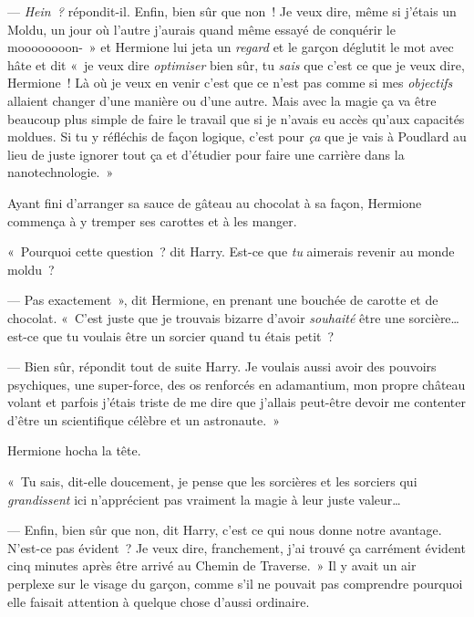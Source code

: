 --- \emph{Hein~?} répondit-il.
Enfin, bien sûr que non~!
Je veux dire, même si j'étais un Moldu, un jour où l'autre j'aurais quand même essayé de conquérir le moooooooon-~» et Hermione lui jeta un \emph{regard} et le garçon déglutit le mot avec hâte et dit «~je veux dire \emph{optimiser} bien sûr, tu \emph{sais} que c'est ce que je veux dire, Hermione~!
Là où je veux en venir c'est que ce n'est pas comme si mes \emph{objectifs} allaient changer d'une manière ou d'une autre.
Mais avec la magie ça va être beaucoup plus simple de faire le travail que si je n'avais eu accès qu'aux capacités moldues.
Si tu y réfléchis de façon logique, c'est pour \emph{ça} que je vais à Poudlard au lieu de juste ignorer tout ça et d'étudier pour faire une carrière dans la nanotechnologie.~»

Ayant fini d'arranger sa sauce de gâteau au chocolat à sa façon, Hermione commença à y tremper ses carottes et à les manger.

«~Pourquoi cette question~? dit Harry.
Est-ce que \emph{tu} aimerais revenir au monde moldu~?

--- Pas exactement~», dit Hermione, en prenant une bouchée de carotte et de chocolat.
«~C'est juste que je trouvais bizarre d'avoir \emph{souhaité} être une sorcière… est-ce que tu voulais être un sorcier quand tu étais petit~?

--- Bien sûr, répondit tout de suite Harry.
Je voulais aussi avoir des pouvoirs psychiques, une super-force, des os renforcés en adamantium, mon propre château volant et parfois j'étais triste de me dire que j'allais peut-être devoir me contenter d'être un scientifique célèbre et un astronaute.~»

Hermione hocha la tête.

«~Tu sais, dit-elle doucement, je pense que les sorcières et les sorciers qui \emph{grandissent} ici n'apprécient pas vraiment la magie à leur juste valeur…

--- Enfin, bien sûr que non, dit Harry, c'est ce qui nous donne notre avantage.
N'est-ce pas évident~?
Je veux dire, franchement, j'ai trouvé ça carrément évident cinq minutes après être arrivé au Chemin de Traverse.~»
Il y avait un air perplexe sur le visage du garçon, comme s'il ne pouvait pas comprendre pourquoi elle faisait attention à quelque chose d'aussi ordinaire.
